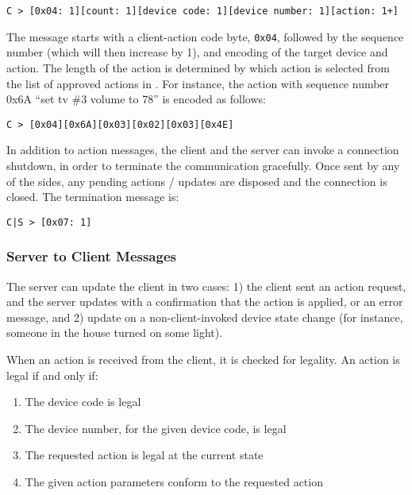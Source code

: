 \begin{verbatim}
C > [0x04: 1][count: 1][device code: 1][device number: 1][action: 1+]
\end{verbatim}

\noindent
The message starts with a client-action code byte, {\tt 0x04}, followed by the sequence number (which will then increase by 1), and encoding of the target device and action. The length of the action is determined by which action is selected from the list of approved actions in . For instance, the action with sequence number 0x6A ``set tv \#3 volume to 78'' is encoded as follows:

\begin{verbatim}
C > [0x04][0x6A][0x03][0x02][0x03][0x4E]
\end{verbatim}

\noindent
In addition to action messages, the client and the server can invoke a connection shutdown, in order to terminate the communication gracefully. Once sent by any of the sides, any pending actions / updates are disposed and the connection is closed. The termination message is:

\begin{verbatim}
C|S > [0x07: 1]
\end{verbatim}


\subsubsection{Server to Client Messages}
\label{sec:pdus:pdu:s_to_c}

The server can update the client in two cases: 1) the client sent an action request, and the server updates with a confirmation that the action is applied, or an error message, and 2) update on a non-client-invoked device state change (for instance, someone in the house turned on some light).

When an action is received from the client, it is checked for legality. An action is legal if and only if:
\begin{enumerate}
\item The device code is legal
\item The device number, for the given device code, is legal
\item The requested action is legal at the current state
\item The given action parameters conform to the requested action
\end{enumerate}


